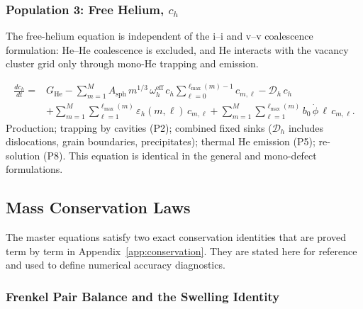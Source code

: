\subsubsection{Population 3: Free Helium, $c_h$}
\label{sec:ME_He}

The free-helium equation is independent of the i--i and v--v coalescence
formulation: He--He coalescence is excluded, and He interacts with the
vacancy cluster grid only through mono-He trapping and emission.

\begin{equation}\label{eq:ME_He}
\boxed{
\begin{split}
\frac{dc_h}{dt} = {} &
  G_{\mathrm{He}}
  - \sum_{m=1}^{M}
     A_{\mathrm{sph}}\,m^{1/3}\,\omega_h^{\mathrm{eff}}\,c_h
     \sum_{\ell=0}^{\ell_{\max}(m)-1} c_{m,\ell}
  - \mathcal{D}_h\,c_h
  \\[3pt]
  &+ \sum_{m=1}^{M}\sum_{\ell=1}^{\ell_{\max}(m)}
     \varepsilon_h(m,\ell)\,c_{m,\ell}
  + \sum_{m=1}^{M}\sum_{\ell=1}^{\ell_{\max}(m)}
     b_0\,\dot{\phi}\,\ell\,c_{m,\ell}.
\end{split}
}
\end{equation}
Production; trapping by cavities (P2); combined fixed sinks
($\mathcal{D}_h$ includes dislocations, grain boundaries, precipitates);
thermal He emission (P5); re-solution (P8). This equation is identical
in the general and mono-defect formulations.


\subsection{Mass Conservation Laws}
\label{sec:mass_conservation}

The master equations satisfy two exact conservation identities that are
proved term by term in Appendix~\ref{app:conservation}. They are stated
here for reference and used to define numerical accuracy diagnostics.

\subsubsection{Frenkel Pair Balance and the Swelling Identity}
\label{sec:FP_balance}


